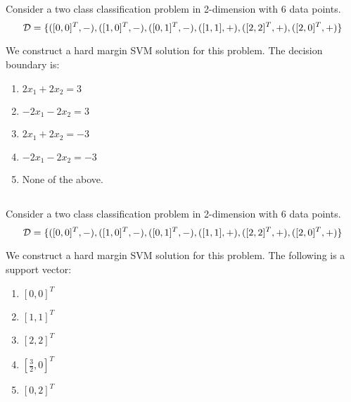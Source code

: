 
\begin{frame}
\section{}
Consider a two class classification problem in 2-dimension with 6 data points.
\[ {\cal D} = \{([0,0]^T,-), ([1,0]^T,-), ([0,1]^T,-), ([1,1],+), ([2,2]^T,+), ([2,0]^T,+)  \}\]

We construct a hard margin SVM solution for this problem. The decision boundary is:
\begin{enumerate}[label=(\Alph*)]
\item $2x_1 + 2x_2 = 3$   %
\item $-2x_1 - 2x_2 = 3$
\item $2x_1 + 2x_2 = -3$
\item $-2x_1 - 2x_2 = -3$   %
\item None of the above.  %

\end{enumerate}

\end{frame}


\begin{frame}
\section{}
Consider a two class classification problem in 2-dimension with 6 data points.
\[ {\cal D} = \{([0,0]^T,-), ([1,0]^T,-), ([0,1]^T,-), ([1,1],+), ([2,2]^T,+), ([2,0]^T,+)  \}\]

We construct a hard margin SVM solution for this problem. The following is a support vector:

\begin{enumerate}[label=(\Alph*)]
\item $[0,0]^T$
\item $[1,1]^T$    %
\item $[2,2]^T$
\item $[\frac{3}{2},0]^T$
\item $[0,2]^T$
\end{enumerate}
\end{frame}


